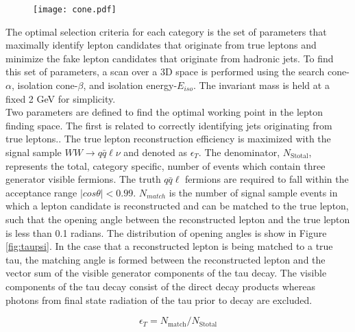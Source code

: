\begin{figure}

\texttt{[image: cone.pdf]}

\end{figure}
 The optimal selection criteria for each category is the set of parameters that maximally identify lepton candidates that originate from true leptons and minimize the fake lepton candidates that originate from hadronic jets. To find this set of parameters, a scan over a 3D space is performed using the search cone-$\alpha$, isolation cone-$\beta$, and isolation energy-$E_{iso}$. The invariant mass is held at a fixed 2 GeV for simplicity.\\
Two parameters are defined to find the optimal working point in the lepton finding space. The first is related to correctly identifying jets originating from true leptons..
The true lepton reconstruction efficiency is maximized with the signal sample $WW\rightarrow q\bar{q}\ell\nu$ and denoted as  $\epsilon_T$. The denominator, $N_{\text{Stotal}}$, represents the total, category specific, number of events which contain three generator visible fermions. The truth $q\bar{q}\ell$ fermions are required to fall within the acceptance range $|cos\theta| < 0.99$. $N_{match}$ is the number of signal sample events in which a lepton candidate is reconstructed and can be matched to the true lepton, such that the opening angle between the reconstructed lepton and the true lepton is less than 0.1 radians. The distribution of opening angles is show in Figure \ref{fig:taupsi}. In the case that a reconstructed lepton is being matched to a true tau, the matching angle is formed between the reconstructed lepton and the vector sum of the visible generator components of the tau decay. The visible components of the tau decay consist of the direct decay products whereas photons from final state radiation of the tau prior to decay are excluded.

\begin{equation}
\label{eq:et}
\epsilon_T = N_{\text{match}}/N_{\text{Stotal}}
\end{equation}

